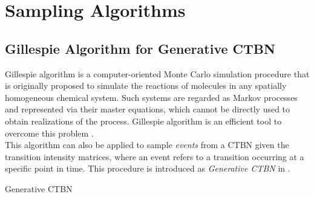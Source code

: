 
\section{Sampling Algorithms}
\label{sec:sampling_alg}
\subsection{Gillespie Algorithm for Generative CTBN}
Gillespie algorithm is a computer-oriented Monte Carlo simulation procedure that is originally proposed to simulate the reactions of molecules in any spatially homogeneous chemical system. Such systems are regarded as Markov processes and represented via their master equations, which cannot be directly used to obtain realizations of the process. Gillespie algorithm is an efficient tool to overcome this problem \cite{Gillespie1976}.\\
This algorithm can also be applied to sample \textit{events} from a CTBN given the transition intensity matrices, where an event refers to a transition occurring at a specific point in time. This procedure is introduced as \textit{Generative CTBN} in \cite{Nodelman1995}.


\begin{algorithm}[H]
	
	
	\begin{algorithmic}[1]
		\ENDWHILE
	\end{algorithmic}
	\caption{Generative CTBN}
	\label{alg:generative_ctbn}
\end{algorithm}


